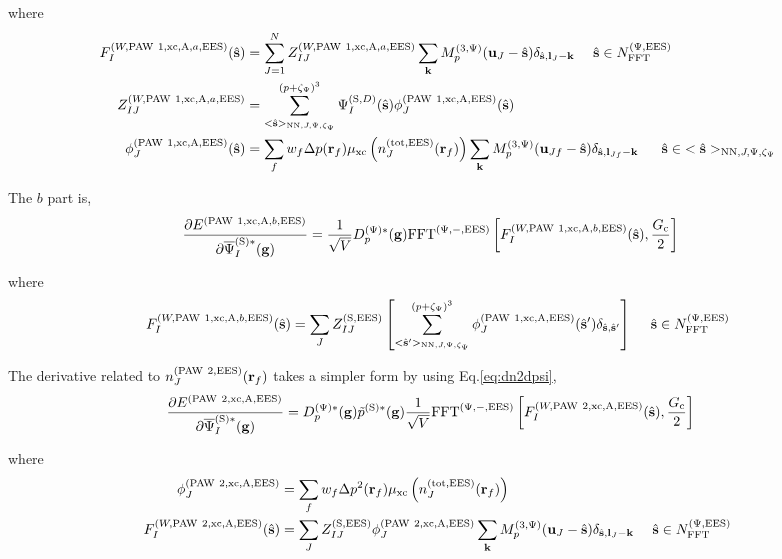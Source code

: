 \documentclass[paper=a4, fontsize=11pt]{article} %
\numberwithin{equation}{section} %
\numberwithin{figure}{section} %
\numberwithin{table}{section} %
\newcommand{\p}{\partial}
\newcommand{\bu}{{\bf{u}}}
\newcommand{\bl}{{\bf{l}}}
\newcommand{\bk}{{\bf{k}}}
\newcommand{\bs}{{\bf{s}}}
\newcommand{\bg}{{\bf{g}}}
\newcommand{\br}{{\bf{r}}}
\newcommand{\hs}{{\hat{\bf{s}}}}
\newcommand{\rS}{{\mathrm{S}}}
\newcommand{\rEES}{{\mathrm{EES}}}
\newcommand{\rxc}{{\mathrm{xc}}}
\newcommand{\rNN}{{\mathrm{NN}}}
\newcommand{\rP}{{\mathrm{PAW}}}
\newcommand{\rA}{{\mathrm{A}}}
\newcommand{\rtot}{{\mathrm{tot}}}
\newcommand{\psigsc}{{\overline \Psi_I^{(\rS)*}(\bg)}}
\newcommand{\NFFTpEES}{{N^{\mathrm{(\Psi,\rEES})}_{\mathrm{FFT}}}}
\newcommand{\hGc}{{\frac{G_{\mathrm{c}}}{2}}}
\newcommand{\Dpgc}{{D^{(\Psi)*}_p(\bg)}}
\newcommand{\Mp}{{M_p^{(3,\Psi)}}}
\newcommand{\FFTpiEES}{{\mathrm{FFT}^{(\Psi,-,\rEES)}}}
\newcommand{\pzp}{{(p+\zeta_{\Psi})^3}}
\newcommand{\hsJp}{{<\hs>_{\rNN,J,\Psi,\zeta_\Psi}}}
\newcommand{\hsinJp}{{\ \ \ \ \ \hs  \in  \hsJp}}
\newcommand{\hspJp}{{<\hs'>_{\rNN,J,\Psi,\zeta_\Psi}}}
\newcommand{\hsinpEES}{{\ \ \ \ \hs \in \NFFTpEES}}
\begin{document}
where
\begin{equation}
\begin{split}
F_I^{(W,\rP\ 1,\rxc,\rA,a,\rEES)}(\hs) &= \sum_{J=1}^N Z_{IJ}^{(W,\rP\ 1,\rxc,\rA,a,\rEES)}\sum_{\bk} \Mp(\bu_{J}-\hat \bs) \delta_{\hat \bs,\bl_J-\bk} \hsinpEES \\
Z_{IJ}^{(W,\rP\ 1,\rxc,\rA,a,\rEES)} &= \sum_{\hsJp}^{\pzp} \Psi_{I}^{(\rS,D)}(\hat \bs) \phi_J^{(\rP\ 1,\rxc,\rA,\rEES)}(\hs) \\
\phi_J^{(\rP\ 1,\rxc,\rA,\rEES)}(\hs) &= \sum_f w_f \Delta p(\br_f) \mu_{\rxc}\left(n_J^{(\rtot,\rEES)}(\br_f)\right)  \sum_{\bk} \Mp(\bu_{Jf}-\hat \bs)\delta_{\hat \bs,\bl_{Jf}-\bk} \hsinJp\\
\end{split}
\end{equation}

The $b$ part is,
\begin{equation}
\begin{split}
\frac{\p E^{(\rP\ 1,\rxc,\rA,b,\rEES)}}{\p \psigsc}
&= \frac{1}{\sqrt V} \Dpgc \FFTpiEES \left[F_I^{(W,\rP\ 1,\rxc,\rA,b,\rEES)}(\hs),\hGc\right]
\end{split}
\end{equation}

where 
\begin{equation}
\begin{split}
F_I^{(W,\rP\ 1,\rxc,\rA,b,\rEES)}(\hs)&= \sum_J Z_{IJ}^{(\rS,\rEES)}\left[\sum_{\hspJp}^\pzp \phi_J^{(\rP\ 1,\rxc,\rA,\rEES)}(\hs') \delta_{\hs,\hs'}\right]\hsinpEES\\
\end{split}
\end{equation}



The derivative related to $n_J^{(\rP\ 2,\rEES)}(\br_f)$ takes a simpler form by using Eq.\eqref{eq:dn2dpsi},
\begin{equation}
\begin{split}
\frac{\p E^{(\rP\ 2,\rxc,\rA,\rEES)}}{\p \psigsc}
&= \Dpgc\tilde p^{(\rS)*}(\bg)\frac{1}{\sqrt{V}}\FFTpiEES \left[F_I^{(W,\rP\ 2,\rxc,\rA,\rEES)}(\hs),\hGc \right]
\end{split}
\end{equation}

where
\begin{equation}
\begin{split}
\phi_J^{(\rP\ 2,\rxc,\rA,\rEES)} &= \sum_f w_f \Delta p^2(\br_f) \mu_{\rxc}\left(n_J^{(\rtot,\rEES)}(\br_f)\right) \\
F_I^{(W,\rP\ 2,\rxc,\rA,\rEES)}(\hs) &= \sum_J  Z_{IJ}^{(\rS,\rEES)} \phi_J^{(\rP\ 2,\rxc,\rA,\rEES)} \sum_{\bk}  \Mp(\bu_{J}-\hat \bs)\delta_{\hat \bs,\bl_J-\bk} \hsinpEES \\
\end{split}
\end{equation}
\end{document}
